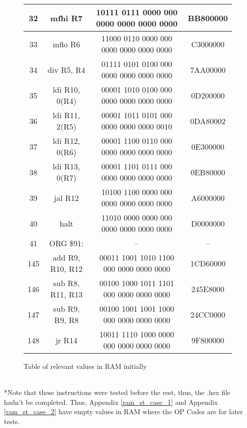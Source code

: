 \documentclass{article}
\begin{document}
\begin{figure}[h!]
\begin{center}
\begin{tabular}{|c|c|c|c|}
                \hline
                32 & mfhi R7 & 10111 0111 0000 000 0000 0000 0000 0000 & BB800000 \\
                \hline
                33 & mflo R6 & 11000 0110 0000 000 0000 0000 0000 0000 & C3000000 \\
                \hline
                34 & div R5, R4 & 01111 0101 0100 000 0000 0000 0000 0000 & 7AA00000 \\
                \hline
                35 & ldi R10, 0(R4) & 00001 1010 0100 000 0000 0000 0000 0000 & 0D200000 \\
                \hline
                36 & ldi R11, 2(R5) & 00001 1011 0101 000 0000 0000 0000 0010 & 0DA80002 \\
                \hline
                37 & ldi R12, 0(R6) & 00001 1100 0110 000 0000 0000 0000 0000 & 0E300000 \\
                \hline
                38 & ldi R13, 0(R7) & 00001 1101 0111 000 0000 0000 0000 0000 & 0EB80000 \\
                \hline
                39 & jal R12 & 10100 1100 0000 000 0000 0000 0000 0000 &A6000000 \\
                \hline
                40 & halt & 11010 0000 0000 000 0000 0000 0000 0000 &D0000000 \\
                \hline
                41 & ORG \$91: & – & –\\
                \hline
                145 &add R9, R10, R12 & 00011 1001 1010 1100 000 0000 0000 0000 & 1CD60000\\
                \hline
                146 &sub R8, R11, R13 & 00100 1000 1011 1101 000 0000 0000 0000 & 245E8000\\
                \hline
                147 & sub R9, R9, R8 & 00100 1001 1001 1000 000 0000 0000 0000 & 24CC0000\\
                \hline
                148 & jr R14 & 10011 1110 1000 0000 000 0000 0000 0000 & 9F800000\\
                
            \end{tabular}
            \caption{Table of relevant values in RAM initially}
        \end{center}
    \end{figure}
    \\
    \small{*Note that these instructions were tested before the rest, thus, the .hex file hadn't be completed. Thus, Appendix \ref{ram_st_case_1} and Appendix \ref{ram_st_case_2} have empty values in RAM where the OP Codes are for later tests.}
\end{document}
